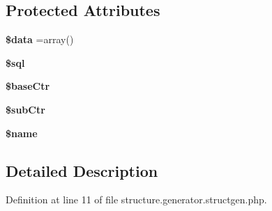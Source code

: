 \subsection*{Protected Attributes}
\begin{DoxyCompactItemize}
\item 
\hypertarget{classstructgen_a6efc15b5a2314dd4b5aaa556a375c6d6}{{\bfseries \$data} =array()}\label{classstructgen_a6efc15b5a2314dd4b5aaa556a375c6d6}

\item 
\hypertarget{classstructgen_a047170d6020a882807665812a27e2525}{{\bfseries \$sql}}\label{classstructgen_a047170d6020a882807665812a27e2525}

\item 
\hypertarget{classstructgen_af28a2bf1bdf5c6f3ffeb459f2bba572b}{{\bfseries \$base\-Ctr}}\label{classstructgen_af28a2bf1bdf5c6f3ffeb459f2bba572b}

\item 
\hypertarget{classstructgen_a629dff33e6ad4aecc6c382d488cdcb08}{{\bfseries \$sub\-Ctr}}\label{classstructgen_a629dff33e6ad4aecc6c382d488cdcb08}

\item 
\hypertarget{classstructgen_ab2fc40d43824ea3e1ce5d86dee0d763b}{{\bfseries \$name}}\label{classstructgen_ab2fc40d43824ea3e1ce5d86dee0d763b}

\end{DoxyCompactItemize}


\subsection{Detailed Description}


Definition at line 11 of file structure.\-generator.\-structgen.\-php.



